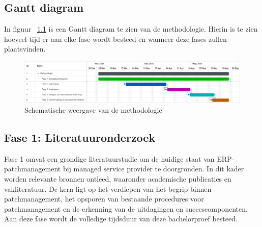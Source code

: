 
\chapter{}%
\label{ch:methodologie}


\section{Gantt diagram}
In figuur ~\ref{fig:methodologie2} is een Gantt diagram te zien van de methodologie. Hierin is te zien hoeveel tijd er aan elke fase wordt besteed en wanneer deze fases zullen plaatsvinden.
\begin{figure}[h]
    \centering
    \includegraphics[width=\textwidth]{methodologie2.png}
    \caption{Schematische weergave van de methodologie}
     \label{fig:methodologie2}
\end{figure}
\newpage

\section{Fase 1: Literatuuronderzoek}
Fase 1 omvat een grondige literatuurstudie om de huidige staat van ERP-patchmanagement bij managed service provider te doorgronden. In dit kader worden relevante bronnen ontleed, waaronder 
academische publicaties en vakliteratuur. De kern ligt op het verdiepen van het begrip binnen patchmanagement, het opsporen van bestaande procedures voor patchmanagement en de erkenning van de uitdagingen en succescomponenten. Aan deze fase wordt de volledige tijdsduur van deze bachelorproef besteed.
